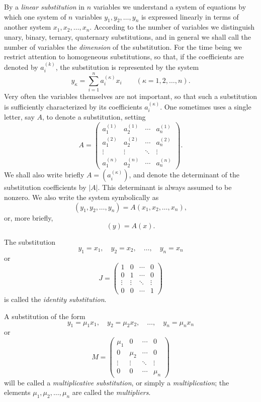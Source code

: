 \documentclass[11pt]{article}
\begin{document}
By a \emph{linear substitution} in \(n\) variables we understand a system of equations by which one system of \(n\) variables \(y_1,y_2,\dots,y_n\) is expressed linearly in terms of another system \(x_1,x_2,\dots,x_n\). According to the number of variables we distinguish unary, binary, ternary, quaternary substitutions, and in general we shall call the number of variables the \emph{dimension} of the substitution. For the time being we restrict attention to homogeneous substitutions, so that, if the coefficients are denoted by \(a^{(k)}_i\), the substitution is represented by the system
\[
y_\kappa=\sum_{i=1}^n a^{(\kappa)}_i x_i
\qquad (\kappa=1,2,\dots,n).
\tag{1}
\]
Very often the variables themselves are not important, so that such a substitution is sufficiently characterized by its coefficients \(a^{(\kappa)}_i\). One sometimes uses a single letter, say \(A\), to denote a substitution, setting
\[
A=
\begin{pmatrix}
a^{(1)}_1 & a^{(1)}_2 & \cdots & a^{(1)}_n \\
a^{(2)}_1 & a^{(2)}_2 & \cdots & a^{(2)}_n \\
\vdots & \vdots & \ddots & \vdots \\
a^{(n)}_1 & a^{(n)}_2 & \cdots & a^{(n)}_n
\end{pmatrix}.
\tag{2}
\]
We shall also write briefly \(A=(a^{(\kappa)}_i)\), and denote the determinant of the substitution coefficients by \(|A|\). This determinant is always assumed to be nonzero. We also write the system symbolically as
\[
(y_1,y_2,\dots,y_n)=A(x_1,x_2,\dots,x_n),
\tag{3}
\]
or, more briefly,
\[
(y)=A(x).
\tag{4}
\]

The substitution
\[
y_1=x_1,\quad y_2=x_2,\quad \dots,\quad y_n=x_n
\tag{5}
\]
or
\[
J=
\begin{pmatrix}
1 & 0 & \cdots & 0\\
0 & 1 & \cdots & 0\\
\vdots & \vdots & \ddots & \vdots\\
0 & 0 & \cdots & 1
\end{pmatrix}
\tag{6}
\]
is called the \emph{identity substitution}.

A substitution of the form
\[
y_1=\mu_1x_1,\quad y_2=\mu_2x_2,\quad \dots,\quad y_n=\mu_nx_n
\tag{7}
\]
or
\[
M=
\begin{pmatrix}
\mu_1 & 0 & \cdots & 0\\
0 & \mu_2 & \cdots & 0\\
\vdots & \vdots & \ddots & \vdots\\
0 & 0 & \cdots & \mu_n
\end{pmatrix}
\tag{8}
\]
will be called a \emph{multiplicative substitution}, or simply a \emph{multiplication}; the elements \(\mu_1,\mu_2,\dots,\mu_n\) are called the \emph{multipliers}.
\end{document}
